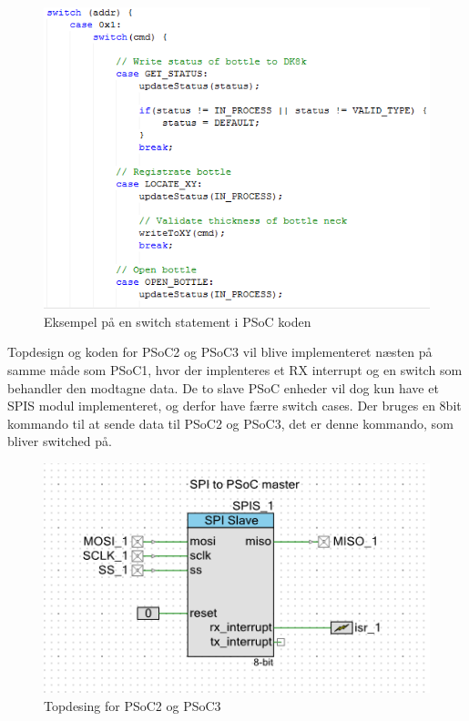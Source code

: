 \begin{figure}[H]
\includegraphics{Screenshots/PSOC_switch}
\caption{Eksempel på en switch statement i PSoC koden}
\end{figure}

Topdesign og koden for PSoC2 og PSoC3 vil blive implementeret næsten på samme måde som PSoC1, hvor der implenteres et RX interrupt og en switch som 
behandler den modtagne data. De to slave PSoC enheder vil dog kun have et SPIS modul implementeret, og derfor have færre switch cases.
Der bruges en 8bit kommando til at sende data til PSoC2 og PSoC3, det er denne kommando, som bliver switched på.  
\begin{figure}[H]
\includegraphics{Screenshots/PSOC_topdesign_SPIS}
\caption{Topdesing for PSoC2 og PSoC3}
\end{figure}

